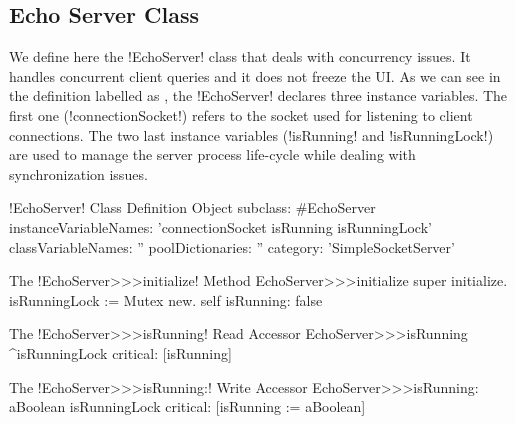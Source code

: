 \documentclass[a4paper,10pt,twoside]{book}
\begin{document}
%

\subsection{Echo Server Class}
We define here the \ct!EchoServer! class that deals with concurrency issues.
It handles concurrent client queries and it does not freeze the UI.
As we can see in the definition labelled as , the \ct!EchoServer! declares three instance variables.
The first one (\ct!connectionSocket!) refers to the socket used for listening to client connections.
The two last instance variables (\ct!isRunning! and \ct!isRunningLock!) are used to manage the server process life-cycle while dealing with synchronization issues.
 
\begin{classdef}[echoServerClassDef]{\ct!EchoServer! Class Definition}
Object subclass: #EchoServer
	instanceVariableNames: 'connectionSocket isRunning isRunningLock'
	classVariableNames: ''
	poolDictionaries: ''
	category: 'SimpleSocketServer'
\end{classdef}

\begin{method}{The \ct!EchoServer>>>initialize! Method}
EchoServer>>>initialize 
	super initialize.
	isRunningLock := Mutex new.
	self isRunning: false
\end{method}

\begin{method}{The \ct!EchoServer>>>isRunning! Read Accessor}
EchoServer>>>isRunning
	^isRunningLock critical: [isRunning]
\end{method}

\begin{method}{The \ct!EchoServer>>>isRunning:! Write Accessor}
EchoServer>>>isRunning: aBoolean
	isRunningLock critical: [isRunning := aBoolean]
\end{method}
\end{document}
